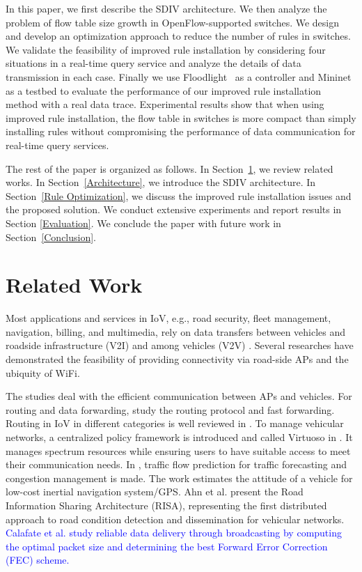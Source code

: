 \documentclass[journal]{IEEEtran}
\begin{document}
In this paper, we first describe the SDIV architecture. We then analyze the problem of flow table size growth in OpenFlow-supported switches. We design and develop an optimization approach to reduce the number of rules in switches. We validate the feasibility of improved rule installation by considering four situations in a real-time query service and analyze the details of data transmission in each case. Finally we use Floodlight~\cite{Floodlight} as a controller and Mininet~\cite{mininet} as a testbed to evaluate the performance of our improved rule installation  method with a real data trace. Experimental results show that when using improved rule installation, the flow table in switches is more compact than simply installing rules without compromising the performance of data communication for real-time query services.

The rest of the paper is organized as follows. In Section~\ref{Related Work}, we review related works. In Section~\ref{Architecture}, we introduce the SDIV architecture. In Section~\ref{Rule Optimization}, we discuss the improved rule installation issues and the proposed solution. We conduct extensive experiments and report results in Section \ref{Evaluation}.  We conclude the paper with future work in Section~\ref{Conclusion}.


\section{Related Work} \label{Related Work}

Most applications and services in IoV, e.g., road security, fleet management, navigation, billing, and multimedia, rely on data transfers between vehicles and roadside infrastructure (V2I) and among vehicles (V2V) \cite{du2015information}.
Several researches \cite{ott2005disconnection, balasubramanian2008interactive} have demonstrated the feasibility of providing connectivity via road-side APs and the ubiquity of WiFi.

The studies \cite{joshi2011vehicular, xu2011utilizing} deal with the efficient communication between APs and vehicles. For routing and data forwarding, \cite{sahu2015bang, zhang2014geomob, zhu2013zoom, nzouonta2009vanet} study the routing protocol and fast forwarding. Routing in IoV in different categories is well reviewed in \cite{cheng2015its}. To manage vehicular networks, a centralized policy framework is introduced and called Virtuoso in \cite{hare2012policy}. It manages spectrum resources while ensuring users to have suitable access to meet their communication needs. In \cite{abadi2015traffic}, traffic flow prediction for traffic forecasting and congestion management is made. The work \cite{wu2013improving} estimates the attitude of a vehicle for low-cost inertial navigation system/GPS. Ahn et al. \cite{ahn2012risa} present the Road Information Sharing Architecture (RISA), representing the first distributed approach to road condition detection and dissemination for vehicular networks. \textcolor{blue}{Calafate et al. \cite{calafate2012efficient} study reliable data delivery through broadcasting by computing the optimal packet size and determining the best Forward Error Correction (FEC) scheme.}
\end{document}
